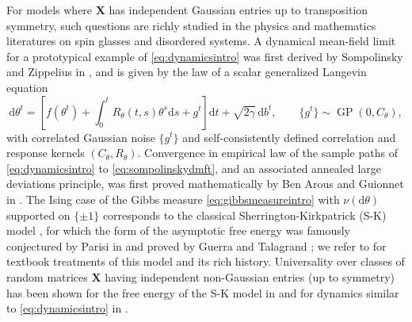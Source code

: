 \documentclass[11pt,letterpaper,reqno]{amsart}
\def\d{\mathrm{d}}
\def\X{\mathbf{X}}
\def\GP{\operatorname{GP}}
\theoremstyle{definition}
\numberwithin{equation}{section}
\begin{document}
For models where $\X$ has
independent Gaussian entries up to transposition symmetry, such
questions are richly studied in the physics and mathematics literatures on spin
glasses and disordered systems. A dynamical mean-field limit for a prototypical
example of \eqref{eq:dynamicsintro} was first derived by Sompolinsky and
Zippelius in \cite{sompolinsky1982relaxational},
and is given by the law of a scalar generalized
Langevin equation
\begin{equation}\label{eq:sompolinskydmft}
\d\theta^t=\left[f(\theta^t)+\int_0^t R_\theta(t,s)\theta^s \d s+g^t\right]\d t
+\sqrt{2\gamma}\,\d b^t,
\qquad \{g^t\} \sim \GP(0,C_\theta),
\end{equation}
with correlated Gaussian noise $\{g^t\}$ and self-consistently defined
correlation and response kernels $(C_\theta,R_\theta)$.
Convergence in empirical law of the sample paths of \eqref{eq:dynamicsintro} to
\eqref{eq:sompolinskydmft}, and an associated annealed large deviations
principle, was first proved mathematically by Ben Arous and Guionnet
in \cite{arous1997symmetric,guionnet1997averaged}. The Ising case of the Gibbs measure \eqref{eq:gibbsmeasureintro}
with $\nu(\d\theta)$ supported on $\{\pm 1\}$ corresponds to the classical
Sherrington-Kirkpatrick (S-K) model \cite{sherrington1975solvable}, for which the form of the asymptotic
free energy was famously conjectured by Parisi in \cite{parisi1979infinite}
and proved by
Guerra and Talagrand \cite{guerra2003broken,talagrand2006parisi}; we refer to
\cite{talagrand2010mean,talagrand2011mean,panchenko2013sherrington} for textbook treatments
of this model and its rich history. Universality over classes of random 
matrices $\X$ having independent non-Gaussian entries (up to symmetry)
has been shown for the free energy of the S-K model in \cite{carmona2006universality} and for
dynamics similar to \eqref{eq:dynamicsintro} in
\cite{dembo2021diffusions,dembo2021universality}.
\end{document}
